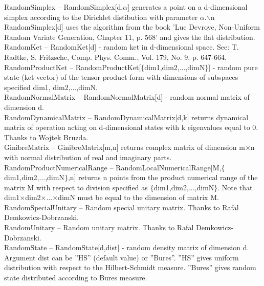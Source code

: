 \documentclass[a4paper,10pt]{scrartcl}
\begin{document}
\noindent\textbf{$ \text{RandomSimplex} $ }-- RandomSimplex[d,$\alpha $] generates a point on a d-dimensional simplex according to the Dirichlet distibution with parameter $\alpha $.$\backslash $n RandomSimplex[d] uses the algorithm from the book 'Luc Devroye, Non-Uniform Random Variate Generation, Chapter 11, p. 568' and gives the flat distribution.$  $\\[8pt]
\noindent\textbf{$ \text{RandomKet} $ }-- RandomKet[d] - random ket in d-dimensional space. See: T. Radtke, S. Fritzsche, Comp. Phys. Comm., Vol. 179, No. 9, p. 647-664.$  $\\[8pt]
\noindent\textbf{$ \text{RandomProductKet} $ }-- RandomProductKet[$\{$dim1,dim2,...,dimN$\}$] - random pure state (ket vector) of the tensor product form with dimensions of subspaces specified dim1, dim2,...,dimN.$  $\\[8pt]
\noindent\textbf{$ \text{RandomNormalMatrix} $ }-- RandomNormalMatrix[d] - random normal matrix of dimension d.$  $\\[8pt]
\noindent\textbf{$ \text{RandomDynamicalMatrix} $ }-- RandomDynamicalMatrix[d,k] returns dynamical matrix of operation acting on d-dimensional states with k eigenvalues equal to 0. Thanks to Wojtek Bruzda.$  $\\[8pt]
\noindent\textbf{$ \text{GinibreMatrix} $ }-- GinibreMatrix[m,n] returns complex matrix of dimension m$\times $n with normal distribution of real and imaginary parts.$  $\\[8pt]
\noindent\textbf{$ \text{RandomProductNumericalRange} $ }-- RandomLocalNumericalRange[M,$\{$dim1,dim2,...,dimN$\}$,n] returns n points from the product numerical range of the matrix M with respect to division specified as $\{$dim1,dim2,...,dimN$\}$. Note that dim1$\times $dim2$\times $...$\times $dimN must be equal to the dimension of matrix M.$  $\\[8pt]
\noindent\textbf{$ \text{RandomSpecialUnitary} $ }-- Random special unitary matrix. Thanks to Rafal Demkowicz-Dobrzanski.$  $\\[8pt]
\noindent\textbf{$ \text{RandomUnitary} $ }-- Random unitary matrix. Thanks to Rafal Demkowicz-Dobrzanski.$  $\\[8pt]
\noindent\textbf{$ \text{RandomState} $ }-- RandomState[d,dist] - random density matrix of dimension d. Argument dist can be ''HS'' (default value) or ''Bures''. ''HS'' gives uniform distribution with respect to the Hilbert-Schmidt measure. ''Bures'' gives random state distributed according to Bures measure.$  $\\[8pt]
\end{document}
